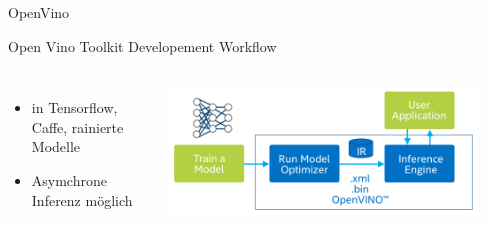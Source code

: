 \begin{frame}{OpenVino}
    
    \begin{block}{\vspace{1cm}Open Vino Toolkit Developement Workflow}
        \begin{columns}[T]
            
            \begin{itemize}
                \item in Tensorflow, Caffe, rainierte Modelle
                \item Asymchrone Inferenz möglich
            \end{itemize}
            

            \begin{center}
                \includegraphics[width=0.9\textwidth]{Bilder/open_vino_workflow_steps.png}    
            
            \end{center}
        
        \end{columns}

        
    \end{block}

        
    
\end{frame}


